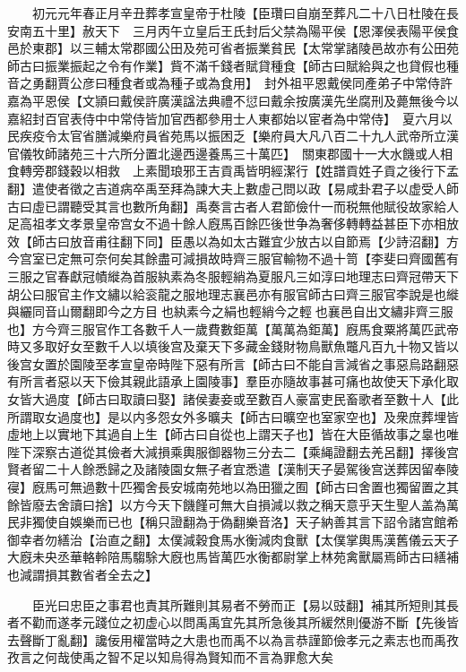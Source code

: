 　　初元元年春正月辛丑葬孝宣皇帝于杜陵【臣瓚曰自崩至葬凡二十八日杜陵在長安南五十里】赦天下　三月丙午立皇后王氏封后父禁為陽平侯【恩澤侯表陽平侯食邑於東郡】以三輔太常郡國公田及苑可省者振業貧民【太常掌諸陵邑故亦有公田苑師古曰振業振起之令有作業】貲不滿千錢者賦貸種食【師古曰賦給與之也貸假也種音之勇翻賈公彦曰種食者或為種子或為食用】　封外祖平恩戴侯同產弟子中常侍許嘉為平恩侯【文頴曰戴侯許廣漢諡法典禮不愆曰戴余按廣漢先坐腐刑及薨無後今以嘉紹封百官表侍中中常侍皆加官西都參用士人東都始以宦者為中常侍】　夏六月以民疾疫令太官省膳減樂府員省苑馬以振困乏【樂府員大凡八百二十九人武帝所立漢官儀牧師諸苑三十六所分置北邊西邊養馬三十萬匹】　關東郡國十一大水饑或人相食轉旁郡錢穀以相救　上素聞琅邪王吉貢禹皆明經潔行【姓譜貢姓子貢之後行下孟翻】遣使者徵之吉道病卒禹至拜為諫大夫上數虛己問以政【易咸卦君子以虚受人師古曰虛已謂聽受其言也數所角翻】禹奏言古者人君節儉什一而税無他賦役故家給人足高祖孝文孝景皇帝宫女不過十餘人廐馬百餘匹後世争為奢侈轉轉益甚臣下亦相放效【師古曰放音甫往翻下同】臣愚以為如太古難宜少放古以自節焉【少詩沼翻】方今宫室已定無可奈何矣其餘盡可減損故時齊三服官輸物不過十笥【李斐曰齊國舊有三服之官春獻冠幘縰為首服紈素為冬服輕綃為夏服凡三如淳曰地理志曰齊冠帶天下胡公曰服官主作文繡以給衮龍之服地理志襄邑亦有服官師古曰齊三服官李說是也縰與纚同音山爾翻即今之方目也紈素今之絹也輕綃今之輕也襄邑自出文繡非齊三服也】方今齊三服官作工各數千人一歲費數鉅萬【萬萬為鉅萬】廐馬食粟將萬匹武帝時又多取好女至數千人以填後宫及棄天下多藏金錢財物鳥獸魚鼈凡百九十物又皆以後宫女置於園陵至孝宣皇帝時陛下惡有所言【師古曰不能自言減省之事惡烏路翻惡有所言者惡以天下儉其親此語承上園陵事】羣臣亦隨故事甚可痛也故使天下承化取女皆大過度【師古曰取讀曰娶】諸侯妻妾或至數百人豪富吏民畜歌者至數十人【此所謂取女過度也】是以内多怨女外多曠夫【師古曰曠空也室家空也】及衆庶葬埋皆虛地上以實地下其過自上生【師古曰自從也上謂天子也】皆在大臣循故事之辠也唯陛下深察古道從其儉者大減損乘輿服御器物三分去二【乘䋲證翻去羌呂翻】擇後宫賢者留二十人餘悉歸之及諸陵園女無子者宜悉遣【漢制天子晏駕後宫送葬因留奉陵寑】廐馬可無過數十匹獨舍長安城南苑地以為田獵之囿【師古曰舍置也獨留置之其餘皆廢去舍讀曰捨】以方今天下饑饉可無大自損減以救之稱天意乎天生聖人盖為萬民非獨使自娛樂而已也【稱只證翻為于偽翻樂音洛】天子納善其言下詔令諸宫館希御幸者勿繕治【治直之翻】太僕減穀食馬水衡減肉食獸【太僕掌輿馬漢舊儀云天子大廐未央丞華輅軨陪馬騶駼大廐也馬皆萬匹水衡都尉掌上林苑禽獸屬焉師古曰繕補也減謂損其數省者全去之】

　　臣光曰忠臣之事君也責其所難則其易者不勞而正【易以豉翻】補其所短則其長者不勸而遂孝元踐位之初虚心以問禹禹宜先其所急後其所緩然則優游不斷【先後皆去聲斷丁亂翻】讒佞用權當時之大患也而禹不以為言恭謹節儉孝元之素志也而禹孜孜言之何哉使禹之智不足以知烏得為賢知而不言為罪愈大矣

